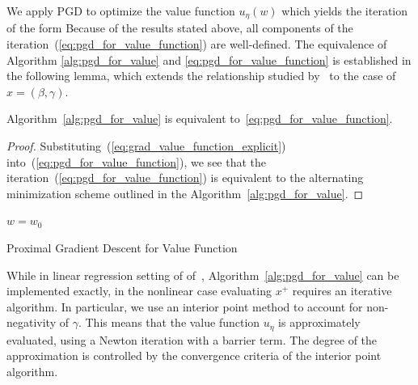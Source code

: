 We apply PGD to optimize the value function $u_\eta(w)$ which yields the iteration of the form
Because of the results stated above, all components of the iteration~(\ref{eq:pgd_for_value_function}) are well-defined. 
The equivalence of Algorithm \ref{alg:pgd_for_value} and 
\eqref{eq:pgd_for_value_function} is established in the following lemma, 
which extends the relationship studied by~\cite{Zheng2019SR3} to the case of $x = (\beta, \gamma)$. 

\begin{lemma}\label{lem:equivalence}
Algorithm~\ref{alg:pgd_for_value} is equivalent to~\eqref{eq:pgd_for_value_function}. 
\end{lemma}
\begin{proof}
Substituting~(\ref{eq:grad_value_function_explicit}) into~(\ref{eq:pgd_for_value_function}), 
we see that the iteration~(\ref{eq:pgd_for_value_function}) is equivalent to the alternating minimization scheme outlined in the Algorithm~\ref{alg:pgd_for_value}.
\end{proof}
\begin{algorithm}[H]
\SetAlgoLined
$w = w_0$ \\
 \caption{\label{alg:pgd_for_value}Proximal Gradient Descent for Value Function}
\end{algorithm}

While in linear regression setting of of~\cite{Zheng2019SR3}, Algorithm~\ref{alg:pgd_for_value} can be implemented exactly, in the nonlinear case 
evaluating $x^+$ requires an iterative algorithm. In particular, we use an interior point method to account for non-negativity of $\gamma$.  
This means that the value function $u_\eta$ is approximately evaluated, using a Newton iteration with a barrier term.  
The degree of the approximation is controlled by the convergence criteria of the interior point algorithm.  


